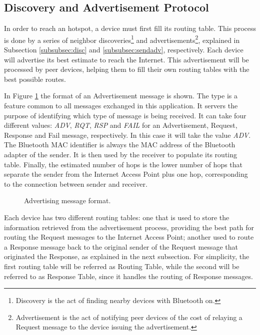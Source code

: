 \subsection{Discovery and Advertisement Protocol}
\label{subsec:disandadv}

In order to reach an hotspot, a device must first fill its routing table. This process is done by a series of neighbor discoveries\footnote{Discovery is the act of finding nearby devices with Bluetooth on.} and advertisements\footnote{Advertisement is the act of notifying peer devices of the cost of relaying a Request message to the device issuing the advertisement.}, explained in Subsection \ref{subsubsec:disc} and \ref{subsubsec:sendadv}, respectively. Each device will advertise its best estimate to reach the Internet. This advertisement will be processed by peer devices, helping them to fill their own routing tables with the best possible routes.

In Figure \ref{fig:advmsg} the format of an Advertisement message is shown. The type is a feature common to all messages exchanged in this application. It servers the purpose of identifying which type of message is being received. It can take four different values: \textit{ADV}, \textit{RQT}, \textit{RSP} and \textit{FAIL} for an Advertisement, Request, Response and Fail message, respectively. In this case it will take the value \textit{ADV}. The Bluetooth \gls{MAC} identifier is always the \gls{MAC} address of the Bluetooth adapter of the sender. It is then used by the receiver to populate its routing table. Finally, the estimated number of hops is the lower number of hops that separate the sender from the Internet Access Point plus one hop, corresponding to the connection between sender and receiver.

\begin{figure}[ht]
	\noindent{}
	\caption{\label{fig:advmsg} Advertising message format.}
\end{figure}

Each device has two different routing tables: one that is used to store the information retrieved from the advertisement process, providing the best path for routing the Request messages to the Internet Access Point; another used to route a Response message back to the original sender of the Request message that originated the Response, as explained in the next subsection. For simplicity, the first routing table will be referred as Routing Table, while the second will be referred to as Response Table, since it handles the routing of Response messages. 

